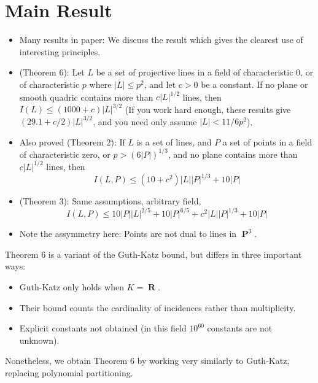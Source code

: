 \documentclass{article}
\theoremstyle{plain}
\newtheorem*{example}{Example}
\DeclareMathOperator{\RR}{\mathbf{R}}
\DeclareMathOperator{\PP}{\mathbf{P}}
\begin{document}
\section{Main Result}

\begin{itemize}
    \item Many results in paper: We discuss the result which gives the clearest use of interesting principles.

    \item (Theorem 6): Let $L$ be a set of projective lines in a field of characteristic $0$, or of characteristic $p$ where $|L| \leq p^2$, and let $c > 0$ be a constant. If no plane or smooth quadric contains more than $c |L|^{1/2}$ lines, then $I(L) \leq (1000 + c) |L|^{3/2}$ (If you work hard enough, these results give $(29.1 + c/2) |L|^{3/2}$, and you need only assume $|L| < 11/6 p^2$).

    \item Also proved (Theorem 2): If $L$ is a set of lines, and $P$ a set of points in a field of characteristic zero, or $p > (6|P|)^{1/3}$, and no plane contains more than $c |L|^{1/2}$ lines, then
    \[ I(L,P) \leq (10 + c^2)|L||P|^{1/3} + 10|P| \]

    \item (Theorem 3): Same assumptions, arbitrary field,
    \[ I(L,P) \leq 10|P||L|^{2/5} + 10 |P|^{6/5} + c^2 |L||P|^{1/3} + 10 |P| \]

    \item Note the assymmetry here: Points are not dual to lines in $\PP^3$.
\end{itemize}

Theorem 6 is a variant of the Guth-Katz bound, but differs in three important ways:
%
\begin{itemize}
    \item Guth-Katz only holds when $K = \RR$.
    \item Their bound counts the cardinality of incidences rather than multiplicity.
    \item Explicit constants not obtained (in this field $10^{60}$ constants are not unknown).
\end{itemize}
%
Nonetheless, we obtain Theorem 6 by working very similarly to Guth-Katz, replacing polynomial partitioning.

\end{document}
